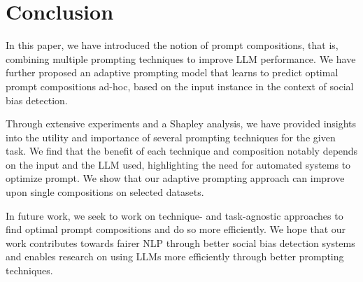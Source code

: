 \section{Conclusion}
\label{sec:conclusion}

In this paper, we have introduced the notion of prompt compositions, that is, combining multiple prompting techniques to improve LLM performance. We have further proposed an adaptive prompting model that learns to predict optimal prompt compositions ad-hoc, based on the input instance in the context of social bias detection.

Through extensive experiments and a Shapley analysis, we have provided insights into the utility and importance of several prompting techniques for the given task. We find that the benefit of each technique and composition notably depends on the input and the LLM used, highlighting the need for automated systems to optimize prompt. We show that our adaptive prompting approach can improve upon single compositions on selected datasets.

In future work, we seek to work on technique- and task-agnostic approaches to find optimal prompt compositions and do so more efficiently. We hope that our work contributes towards fairer NLP through better social bias detection systems and enables research on using LLMs more efficiently through better prompting techniques.
